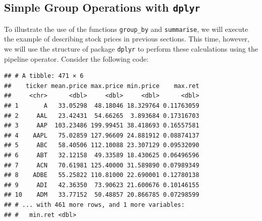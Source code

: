 \documentclass[11pt,]{book}
\newenvironment{Shaded}{\begin{snugshade}}{\end{snugshade}}
\newcommand{\KeywordTok}[1]{\textcolor[rgb]{0.27,0.27,0.27}{\textbf{#1}}}
\newcommand{\DataTypeTok}[1]{\textcolor[rgb]{0.27,0.27,0.27}{#1}}
\newcommand{\StringTok}[1]{\textcolor[rgb]{0.5,0.5,0.5}{#1}}
\newcommand{\CommentTok}[1]{\textcolor[rgb]{0.56,0.35,0.01}{\textit{#1}}}
\newcommand{\OperatorTok}[1]{\textcolor[rgb]{0.81,0.36,0.00}{\textbf{#1}}}
\newcommand{\NormalTok}[1]{#1}
\begin{document}
\subsection{\texorpdfstring{Simple Group Operations with
\texttt{dplyr}}{Simple Group Operations with dplyr}}\label{simple-group-operations-with-dplyr}

To illustrate the use of the functions \texttt{group\_by} and
\texttt{summarise}, we will execute the example of describing stock
prices in previous sections. This time, however, we will use the
structure of package \texttt{dplyr} to perform these calculations using
the pipeline operator. Consider the following code:
 

\begin{Shaded}
\end{Shaded}

\begin{verbatim}
## # A tibble: 471 × 6
##    ticker mean.price max.price min.price    max.ret
##     <chr>      <dbl>     <dbl>     <dbl>      <dbl>
## 1       A   33.05298  48.18046 18.329764 0.11763059
## 2     AAL   23.42431  54.66265  3.893684 0.17316703
## 3     AAP  103.23486 199.99451 38.418693 0.16557581
## 4    AAPL   75.02859 127.96609 24.881912 0.08874137
## 5     ABC   58.40506 112.10088 23.307129 0.09532090
## 6     ABT   32.12158  49.33589 18.430625 0.06496596
## 7     ACN   70.61981 125.40000 31.589890 0.07989349
## 8    ADBE   55.25822 110.81000 22.690001 0.12780138
## 9     ADI   42.36350  73.90623 21.600676 0.10146155
## 10    ADM   33.77152  50.48857 20.866785 0.07298599
## # ... with 461 more rows, and 1 more variables:
## #   min.ret <dbl>
\end{verbatim}
\end{document}

